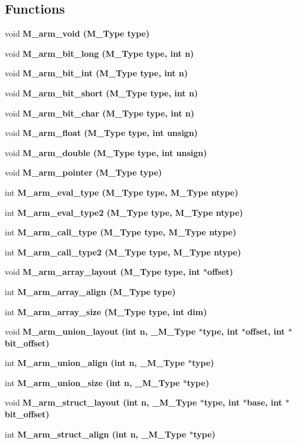 \subsection*{Functions}
\begin{CompactItemize}
\item 
void \bf{M\_\-arm\_\-void} (\bf{M\_\-Type} type)
\item 
void \bf{M\_\-arm\_\-bit\_\-long} (\bf{M\_\-Type} type, int n)
\item 
void \bf{M\_\-arm\_\-bit\_\-int} (\bf{M\_\-Type} type, int n)
\item 
void \bf{M\_\-arm\_\-bit\_\-short} (\bf{M\_\-Type} type, int n)
\item 
void \bf{M\_\-arm\_\-bit\_\-char} (\bf{M\_\-Type} type, int n)
\item 
void \bf{M\_\-arm\_\-float} (\bf{M\_\-Type} type, int unsign)
\item 
void \bf{M\_\-arm\_\-double} (\bf{M\_\-Type} type, int unsign)
\item 
void \bf{M\_\-arm\_\-pointer} (\bf{M\_\-Type} type)
\item 
int \bf{M\_\-arm\_\-eval\_\-type} (\bf{M\_\-Type} type, \bf{M\_\-Type} ntype)
\item 
int \bf{M\_\-arm\_\-eval\_\-type2} (\bf{M\_\-Type} type, \bf{M\_\-Type} ntype)
\item 
int \bf{M\_\-arm\_\-call\_\-type} (\bf{M\_\-Type} type, \bf{M\_\-Type} ntype)
\item 
int \bf{M\_\-arm\_\-call\_\-type2} (\bf{M\_\-Type} type, \bf{M\_\-Type} ntype)
\item 
void \bf{M\_\-arm\_\-array\_\-layout} (\bf{M\_\-Type} type, int $\ast$offset)
\item 
int \bf{M\_\-arm\_\-array\_\-align} (\bf{M\_\-Type} type)
\item 
int \bf{M\_\-arm\_\-array\_\-size} (\bf{M\_\-Type} type, int dim)
\item 
void \bf{M\_\-arm\_\-union\_\-layout} (int n, \bf{\_\-M\_\-Type} $\ast$type, int $\ast$offset, int $\ast$bit\_\-offset)
\item 
int \bf{M\_\-arm\_\-union\_\-align} (int n, \bf{\_\-M\_\-Type} $\ast$type)
\item 
int \bf{M\_\-arm\_\-union\_\-size} (int n, \bf{\_\-M\_\-Type} $\ast$type)
\item 
void \bf{M\_\-arm\_\-struct\_\-layout} (int n, \bf{\_\-M\_\-Type} $\ast$type, int $\ast$base, int $\ast$bit\_\-offset)
\item 
int \bf{M\_\-arm\_\-struct\_\-align} (int n, \bf{\_\-M\_\-Type} $\ast$type)

\end{CompactItemize}
